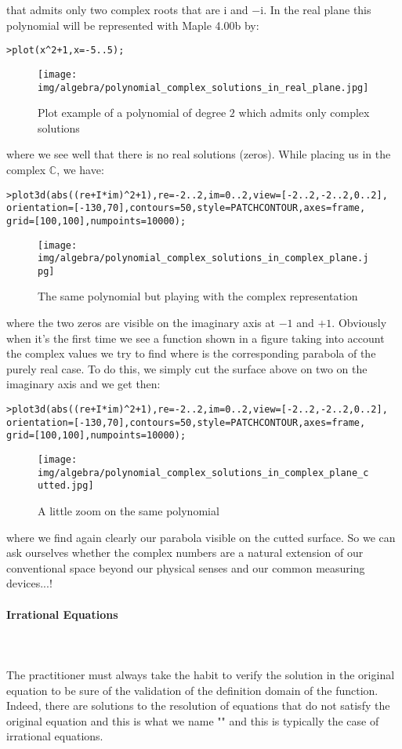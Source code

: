 	that admits only two complex roots that are $\mathrm{i}$ and $-\mathrm{i}$. In the real plane this polynomial will be represented with Maple 4.00b by:
	
	\texttt{>plot(x\string^2+1,x=-5..5);}
	\begin{figure}[H]
		\centering
		\texttt{[image: img/algebra/polynomial\_complex\_solutions\_in\_real\_plane.jpg]}
		\caption[]{Plot example of a polynomial of degree $2$ which admits only complex solutions}
	\end{figure}
	where we see well that there is no real solutions (zeros). While  placing us in the complex $\mathbb{C}$, we have:
	
	\texttt{>plot3d(abs((re+I*im)\string^2+1),re=-2..2,im=0..2,view=[-2..2,-2..2,0..2],\\
	orientation=[-130,70],contours=50,style=PATCHCONTOUR,axes=frame,\\
	grid=[100,100],numpoints=10000);}
	\begin{figure}[H]
		\centering
		\texttt{[image: img/algebra/polynomial\_complex\_solutions\_in\_complex\_plane.jpg]}
		\caption[]{The same polynomial but playing with the complex representation}
	\end{figure}
	where the two zeros are visible on the imaginary axis at $-1$ and $+1$. Obviously when it's the first time we see a function shown in a figure taking into account the complex values we try to find where is the corresponding parabola of the purely real case. To do this, we simply cut the surface above on two on the imaginary axis and we get then:
	
	\texttt{>plot3d(abs((re+I*im)\string^2+1),re=-2..2,im=0..2,view=[-2..2,-2..2,0..2],\\
	orientation=[-130,70],contours=50,style=PATCHCONTOUR,axes=frame,\\
	grid=[100,100],numpoints=10000);}
	\begin{figure}[H]
		\centering
		\texttt{[image: img/algebra/polynomial\_complex\_solutions\_in\_complex\_plane\_cutted.jpg]}
		\caption[]{A little zoom on the same polynomial}
	\end{figure}
	where we find again clearly our parabola visible on the cutted surface. So we can ask ourselves whether the complex numbers are a natural extension of our conventional space beyond our physical senses and our common measuring devices...!

	\paragraph{Irrational Equations}\mbox{}\\\\
	The practitioner must always take the habit to verify the solution in the original equation to be sure of the validation of the definition domain of the function. Indeed, there are solutions to the resolution of equations that do not satisfy the original equation and this is what we name "" and this is typically the case of irrational equations. 

